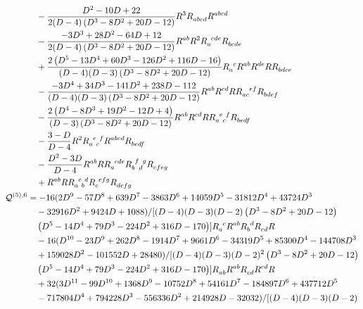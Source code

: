 \documentclass[a4paper,11pt]{article}
\begin{document}
\begin{subequations}
\begin{align}
        &\quad -\frac{D^2-10 D+22}{2 (D-4) \left(D^3-8 D^2+20 D-12\right)}R^3R\indices{_a_b_c_d}R\indices{^a^b^c^d}\nonumber\\
        &\quad -\frac{-3 D^3+28 D^2-64 D+12}{2 (D-4) \left(D^3-8 D^2+20 D-12\right)}R\indices{^a^b}R^2R\indices{_a^c^d^e}R\indices{_b_c_d_e}\nonumber\\
        &\quad +\frac{2 \left(D^5-13 D^4+60 D^3-126 D^2+116 D-16\right)}{(D-4) (D-3) \left(D^3-8 D^2+20 D-12\right)}R\indices{_a^c}R\indices{^a^b}R\indices{^d^e}RR\indices{_b_d_c_e}\nonumber\\
        &\quad -\frac{-3 D^4+34 D^3-141 D^2+238 D-112}{(D-4) (D-3) \left(D^3-8 D^2+20 D-12\right)}R\indices{^a^b}R\indices{^c^d}RR\indices{_a_c^e^f}R\indices{_b_d_e_f}\nonumber\\
        &\quad -\frac{2 \left(D^4-8 D^3+19 D^2-12 D+4\right)}{(D-3) \left(D^3-8 D^2+20 D-12\right)}R\indices{^a^b}R\indices{^c^d}RR\indices{_a^e_c^f}R\indices{_b_e_d_f}\nonumber\\
        &\quad -\frac{3-D}{D-4}R^2R\indices{_a^e_c^f}R\indices{^a^b^c^d}R\indices{_b_e_d_f}\nonumber\\
        &\quad -\frac{D^2-3 D}{D-4}R\indices{^a^b}RR\indices{_a^c^d^e}R\indices{_b^f_d^g}R\indices{_c_f_e_g}\nonumber\\
        &\quad +R\indices{^a^b}RR\indices{_a^c_b^d}R\indices{_c^e^f^g}R\indices{_d_e_f_g}\label{eq:quintic-qtg-5}\\
        \mathcal Q^{(5), 6} & = -16 (2 D^9-57 D^8+639 D^7-3863 D^6+14059 D^5-31812 D^4+43724 D^3\nonumber\\
        &\quad -32916 D^2+9424 D+1088)/[(D-4) (D-3) (D-2) \left(D^3-8 D^2+20 D-12\right)\nonumber\\
        &\quad \left(D^5-14 D^4+79 D^3-224 D^2+316 D-170\right)]R\indices{_a^c}R\indices{^a^b}R\indices{_b^d}R\indices{_c_d}R\nonumber\\
        & \quad -16 (D^{10}-23 D^9+262 D^8-1914 D^7+9661 D^6-34319 D^5+85300 D^4-144708 D^3\nonumber\\
        &\quad+159028 D^2-101552 D+28480)/[(D-4) (D-3) (D-2)^2 \left(D^3-8 D^2+20 D-12\right)\nonumber\\
        &\quad \left(D^5-14 D^4+79 D^3-224 D^2+316 D-170\right)]R\indices{_a_b}R\indices{^a^b}R\indices{_c_d}R\indices{^c^d}R\nonumber\\
        & \quad + 32 (3 D^{11}-99 D^{10}+1368 D^9-10752 D^8+54161 D^7-184897 D^6+437712 D^5\nonumber\\
        &\quad-717804 D^4+794228 D^3-556336 D^2+214928 D-32032) / [(D-4) (D-3) (D-2)\nonumber\\

\end{align}
\end{subequations}
\end{document}
